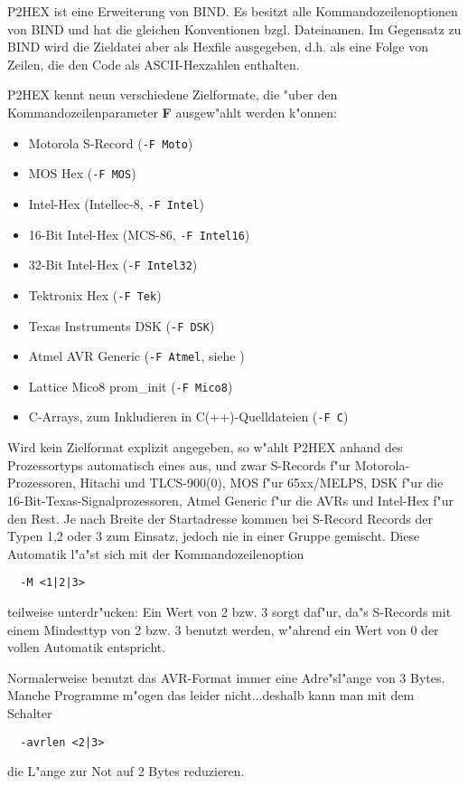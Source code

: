 \documentclass[12pt,a4paper,twoside]{report}
\newcommand{\bb}[1]{{\bf #1}}
\newcommand{\tty}[1]{{\tt #1}}
\begin{document}
P2HEX ist eine Erweiterung von BIND.  Es besitzt alle
Kommandozeilenoptionen von BIND und hat die gleichen Konventionen
bzgl. Dateinamen.  Im Gegensatz zu BIND wird die Zieldatei aber als
Hexfile ausgegeben, d.h. als eine Folge von Zeilen, die den Code als
ASCII-Hexzahlen enthalten.
\par
P2HEX kennt neun verschiedene Zielformate, die "uber den
Kommandozeilenparameter \bb{F} ausgew"ahlt werden k"onnen:
\begin{itemize}
\item{Motorola S-Record (\tty{-F Moto})}
\item{MOS Hex (\tty{-F MOS})}
\item{Intel-Hex (Intellec-8, \tty{-F Intel})}
\item{16-Bit Intel-Hex (MCS-86, \tty{-F Intel16})}
\item{32-Bit Intel-Hex (\tty{-F Intel32})}
\item{Tektronix Hex (\tty{-F Tek})}
\item{Texas Instruments DSK (\tty{-F DSK})}
\item{Atmel AVR Generic (\tty{-F Atmel}, siehe \cite{AVRObj})}
\item{Lattice Mico8 prom\_init (\tty{-F Mico8})}
\item{C-Arrays, zum Inkludieren in C(++)-Quelldateien (\tty{-F C})}
\end{itemize}
Wird kein Zielformat explizit angegeben, so w"ahlt P2HEX anhand des
Prozessortyps automatisch eines aus, und zwar S-Records f"ur Motorola-
Prozessoren, Hitachi und TLCS-900(0), MOS f"ur 65xx/MELPS, DSK f"ur die
16-Bit-Texas-Signalprozessoren, Atmel Generic f"ur die AVRs und Intel-Hex
f"ur den Rest. Je nach Breite der Startadresse kommen bei S-Record Records
der Typen 1,2 oder 3 zum Einsatz, jedoch nie in einer Gruppe gemischt.
Diese Automatik l"a"st sich mit der Kommandozeilenoption
\begin{verbatim}
  -M <1|2|3>
\end{verbatim}
teilweise unterdr"ucken: Ein Wert von 2 bzw. 3 sorgt daf"ur, da"s
S-Records mit einem Mindesttyp von 2 bzw. 3 benutzt werden, w"ahrend ein
Wert von 0 der vollen Automatik entspricht.

Normalerweise benutzt das AVR-Format immer eine Adre"sl"ange von 3 Bytes.
Manche Programme m"ogen das leider nicht...deshalb kann man mit dem
Schalter
\begin{verbatim}
  -avrlen <2|3>
\end{verbatim}
die L"ange zur Not auf 2 Bytes reduzieren.
\end{document}
